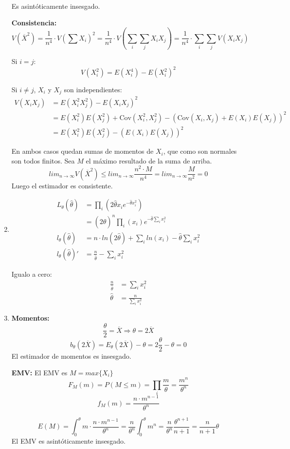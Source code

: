 \begin{enumerate}
		Es asintóticamente insesgado.
		
		\textbf{Consistencia:}
		$$V\left(\overline X^2\right) = \frac{1}{n^4} \cdot V\left(\sum X_i\right)^2
			= \frac{1}{n^4} \cdot V\left(\sum_i \sum_j X_i X_j\right) = \frac{1}{n^4} \cdot \sum_i \sum_j V(X_i X_j)$$
		
		Si $i=j$:
		$$V(X_i^2) = E(X_i^4) - E(X_i^2)^2$$
		
		Si $i\neq j$, $X_i$ y $X_j$ son independientes:
		\begin{align*}
			V(X_iX_j)	& = E(X_i^2X_j^2) - E(X_iX_j)^2	\\
						& = E(X_i^2)E(X_j^2) + \text{Cov}(X_i^2,X_j^2) - (\text{Cov}(X_i, X_j) + E(X_i)E(X_j))^2	\\
						& = E(X_i^2)E(X_j^2) - (E(X_i)E(X_j))^2
		\end{align*}
		
		En ambos casos quedan sumas de momentos de $X_i$, que como son normales son todos finitos.
		Sea $M$ el máximo resultado de la suma de arriba.
		$$lim_{n\rightarrow \infty}V\left(\overline X^2\right)\leq lim_{n\rightarrow \infty}\frac{n^2\cdot M}{n^4} = lim_{n\rightarrow \infty}\frac{M}{n^2} = 0$$
		Luego el estimador es consistente.
	\item
		\begin{align*}
			L_{\theta}(\hat \theta)		& = \prod_i \left(2\hat \theta x_i e^{-\hat \theta x_i^2}\right)		\\
										& = (2\hat \theta)^n \prod_i (x_i) e^{-\hat \theta \sum_i x_i^2}			\\
			l_{\theta}(\hat \theta)		& = n\cdot ln(2\hat \theta) + \sum_i ln(x_i) - \hat \theta \sum_i x_i^2	\\
			l_{\theta}(\hat \theta)'	& = \frac{n}{\hat \theta} - \sum_i x_i^2
		\end{align*}
		
		Igualo a cero:
		\begin{align*}
			\frac{n}{\hat \theta}	& = \sum_i x_i^2	\\
			\hat \theta				& = \frac{n}{\sum_i x_i^2}
		\end{align*}
	
	\item
		\textbf{Momentos:}
			$$\frac{\theta}{2} = \overline{X} \Rightarrow \theta = 2\overline X$$
			$$b_\theta(2\overline X) = E_\theta(2\overline X) - \theta = 2 \frac{\theta}{2} - \theta = 0$$
			El estimador de momentos es insesgado.
			
		\textbf{EMV:}
			El EMV es $M=max\{X_i\}$
			$$F_M(m) = P(M\leq m) = \prod_i \frac{m}{\theta} = \frac{m^n}{\theta^n}$$
			$$f_M(m) = \frac{n\cdot m^{n-1}}{\theta^n}$$
			
			$$E(M) = \int_0^{\theta} m\cdot \frac{n\cdot m^{n-1}}{\theta^n}
				= \frac{n}{\theta^n} \int_0^{\theta} m^n
				= \frac{n}{\theta^n} \frac{\theta^{n+1}}{n+1}
				= \frac{n}{n+1}\theta$$
			El EMV es asintóticamente insesgado.
\end{enumerate}
